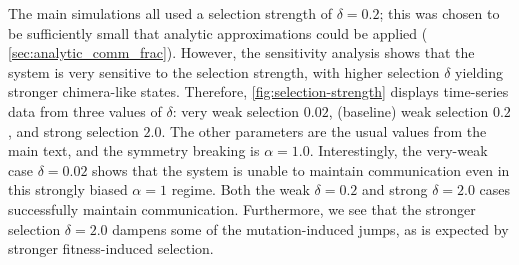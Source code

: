 \documentclass[10pt,letterpaper]{article}
\begin{document}
The main simulations all used a selection strength of $\delta = 0.2$;
this was chosen to be sufficiently small that analytic approximations
could be applied (\cf{} \cref{sec:analytic_comm_frac}).
However, the sensitivity analysis shows that the system is very
sensitive to the selection strength, with higher selection $\delta$
yielding stronger chimera-like states.
Therefore, \cref{fig:selection-strength} displays time-series data
from three values of $\delta$: very weak selection $0.02$, (baseline)
weak selection $0.2$, and strong selection $2.0$.
The other parameters are the usual values from the main text,
and the symmetry breaking is $\alpha = 1.0$.
Interestingly, the very-weak case $\delta = 0.02$ shows that the system
is unable to maintain communication even in this strongly biased
$\alpha=1$ regime.
Both the weak $\delta = 0.2$ and strong $\delta = 2.0$ cases
successfully maintain communication.
Furthermore, we see that the stronger selection $\delta = 2.0$
dampens some of the mutation-induced jumps,
as is expected by stronger fitness-induced selection.
\end{document}
